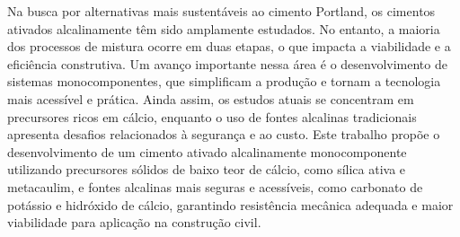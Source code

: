 Na busca por alternativas mais sustentáveis ao cimento Portland, os cimentos ativados
alcalinamente têm sido amplamente estudados. No entanto, a maioria dos processos
de mistura ocorre em duas etapas, o que impacta a viabilidade e a eficiência
construtiva. Um avanço importante nessa área é o desenvolvimento de sistemas
monocomponentes, que simplificam a produção e tornam a tecnologia mais acessível
e prática. Ainda assim, os estudos atuais se concentram em precursores ricos em
cálcio, enquanto o uso de fontes alcalinas tradicionais apresenta desafios relacionados
à segurança e ao custo. Este trabalho propõe o desenvolvimento de um cimento
ativado alcalinamente monocomponente utilizando precursores sólidos de baixo teor
de cálcio, como sílica ativa e metacaulim, e fontes alcalinas mais seguras e acessíveis,
como carbonato de potássio e hidróxido de cálcio, garantindo resistência mecânica
adequada e maior viabilidade para aplicação na construção civil.